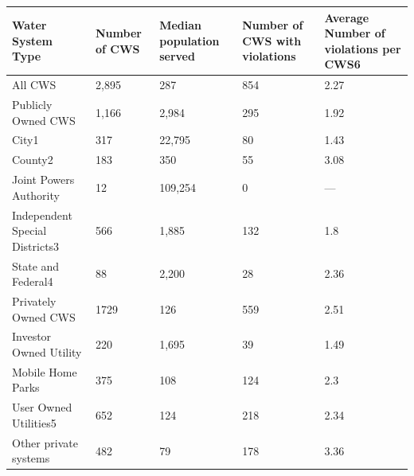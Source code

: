 \begin{table}[]
\begin{tabular}{|l|l|l|l|l|}
\hline
Water   System   Type              & Number   of   CWS & Median   population served & Number   of CWS   with violations & Average   Number   of violations   per   CWS6 \\ \hline
All CWS                            & 2,895             & 287                        & 854                               & 2.27                                          \\ \hline
Publicly   Owned   CWS             & 1,166             & 2,984                      & 295                               & 1.92                                          \\ \hline
City1                              & 317               & 22,795                     & 80                                & 1.43                                          \\ \hline
County2                            & 183               & 350                        & 55                                & 3.08                                          \\ \hline
Joint   Powers   Authority         & 12                & 109,254                    & 0                                 & —                                             \\ \hline
Independent   Special   Districts3 & 566               & 1,885                      & 132                               & 1.8                                           \\ \hline
State   and   Federal4             & 88                & 2,200                      & 28                                & 2.36                                          \\ \hline
Privately   Owned   CWS            & 1729              & 126                        & 559                               & 2.51                                          \\ \hline
Investor   Owned   Utility         & 220               & 1,695                      & 39                                & 1.49                                          \\ \hline
Mobile   Home   Parks              & 375               & 108                        & 124                               & 2.3                                           \\ \hline
User   Owned   Utilities5          & 652               & 124                        & 218                               & 2.34                                          \\ \hline
Other   private   systems          & 482               & 79                         & 178                               & 3.36                                          \\ \hline
\end{tabular}
\end{table}
